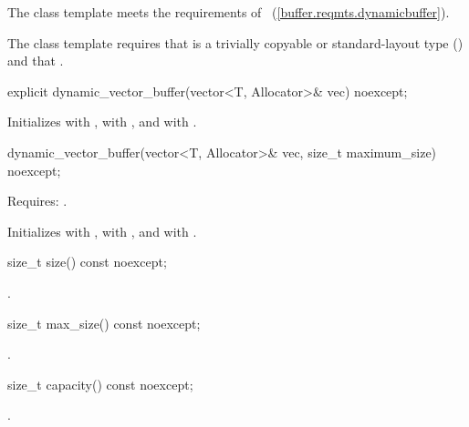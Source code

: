 \pnum
The  class template meets the requirements of ~(\ref{buffer.reqmts.dynamicbuffer}).

\pnum
The  class template requires that  is a trivially copyable or standard-layout type () and that .

\begin{itemdecl}
explicit dynamic_vector_buffer(vector<T, Allocator>& vec) noexcept;
\end{itemdecl}

\begin{itemdescr}
\pnum
\effects Initializes  with ,  with , and  with .
\end{itemdescr}

\begin{itemdecl}
dynamic_vector_buffer(vector<T, Allocator>& vec,
                      size_t maximum_size) noexcept;
\end{itemdecl}

\begin{itemdescr}
\pnum
Requires: .

\pnum
\effects Initializes  with ,  with , and  with .
\end{itemdescr}

\begin{itemdecl}
size_t size() const noexcept;
\end{itemdecl}

\begin{itemdescr}
\pnum
\returns {}.
\end{itemdescr}

\begin{itemdecl}
size_t max_size() const noexcept;
\end{itemdecl}

\begin{itemdescr}
\pnum
\returns {}.
\end{itemdescr}

\begin{itemdecl}
size_t capacity() const noexcept;
\end{itemdecl}

\begin{itemdescr}
\pnum
\returns {}.
\end{itemdescr}

